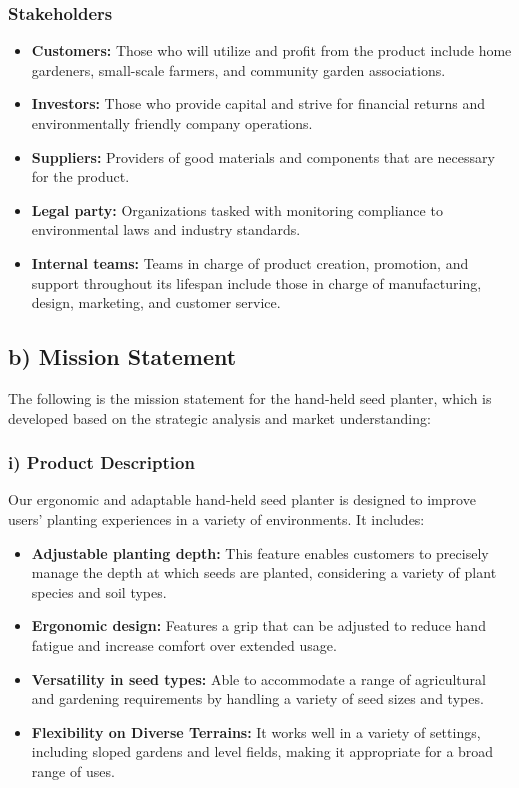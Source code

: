 \subsubsection*{Stakeholders}
\begin{itemize}
    \item \textbf{Customers:} Those who will utilize and profit from the product include home gardeners, small-scale farmers, and community garden associations.
    \item \textbf{Investors:} Those who provide capital and strive for financial returns and environmentally friendly company operations.
    \item \textbf{Suppliers:} Providers of good materials and components that are necessary for the product.
    \item \textbf{Legal party:} Organizations tasked with monitoring compliance to environmental laws and industry standards.
    \item \textbf{Internal teams:} Teams in charge of product creation, promotion, and support throughout its lifespan include those in charge of manufacturing, design, marketing, and customer service.
\end{itemize}

\subsection*{b) Mission Statement}
The following is the mission statement for the hand-held seed planter, which is developed based on the strategic analysis and market understanding:

\subsubsection*{i) Product Description}
Our ergonomic and adaptable hand-held seed planter is designed to improve users' planting experiences in a variety of environments. It includes:
\begin{itemize}
    \item \textbf{Adjustable planting depth:} This feature enables customers to precisely manage the depth at which seeds are planted, considering a variety of plant species and soil types.
    \item \textbf{Ergonomic design:} Features a grip that can be adjusted to reduce hand fatigue and increase comfort over extended usage.
    \item \textbf{Versatility in seed types:} Able to accommodate a range of agricultural and gardening requirements by handling a variety of seed sizes and types.
    \item \textbf{Flexibility on Diverse Terrains:} It works well in a variety of settings, including sloped gardens and level fields, making it appropriate for a broad range of uses.
\end{itemize}

